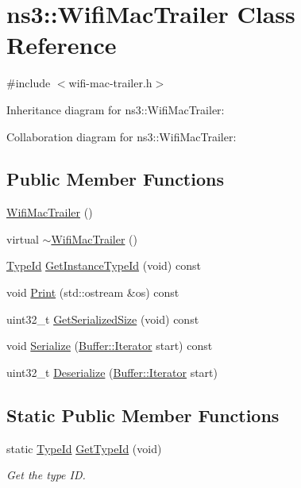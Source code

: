 \hypertarget{classns3_1_1WifiMacTrailer}{}\section{ns3\+:\+:Wifi\+Mac\+Trailer Class Reference}
\label{classns3_1_1WifiMacTrailer}


{\ttfamily \#include $<$wifi-\/mac-\/trailer.\+h$>$}



Inheritance diagram for ns3\+:\+:Wifi\+Mac\+Trailer\+:


Collaboration diagram for ns3\+:\+:Wifi\+Mac\+Trailer\+:
\subsection*{Public Member Functions}
\begin{DoxyCompactItemize}
\item 
\hyperlink{classns3_1_1WifiMacTrailer_a5b6b18a25ef4d58ef891a050fb150ae4}{Wifi\+Mac\+Trailer} ()
\item 
virtual \hyperlink{classns3_1_1WifiMacTrailer_ad84cf615871b883aa2591701d3de8b77}{$\sim$\+Wifi\+Mac\+Trailer} ()
\item 
\hyperlink{classns3_1_1TypeId}{Type\+Id} \hyperlink{classns3_1_1WifiMacTrailer_a6aa6ff54f96c6d213e8cfbca46f5f693}{Get\+Instance\+Type\+Id} (void) const 
\item 
void \hyperlink{classns3_1_1WifiMacTrailer_a8639fb7019173bbdc4307c93ba735d53}{Print} (std\+::ostream \&os) const 
\item 
uint32\+\_\+t \hyperlink{classns3_1_1WifiMacTrailer_a1f2a6bccf9812442fbaf7a533f41887b}{Get\+Serialized\+Size} (void) const 
\item 
void \hyperlink{classns3_1_1WifiMacTrailer_a34048bbf33152f01575c94c3031f7c51}{Serialize} (\hyperlink{classns3_1_1Buffer_1_1Iterator}{Buffer\+::\+Iterator} start) const 
\item 
uint32\+\_\+t \hyperlink{classns3_1_1WifiMacTrailer_a2b6ca88e2481e53d3f050ca6e9baebca}{Deserialize} (\hyperlink{classns3_1_1Buffer_1_1Iterator}{Buffer\+::\+Iterator} start)
\end{DoxyCompactItemize}
\subsection*{Static Public Member Functions}
\begin{DoxyCompactItemize}
\item 
static \hyperlink{classns3_1_1TypeId}{Type\+Id} \hyperlink{classns3_1_1WifiMacTrailer_a46cfecbc580057df579d5216f47bd9f2}{Get\+Type\+Id} (void)
\begin{DoxyCompactList}\small\item\em Get the type ID. \end{DoxyCompactList}\end{DoxyCompactItemize}
